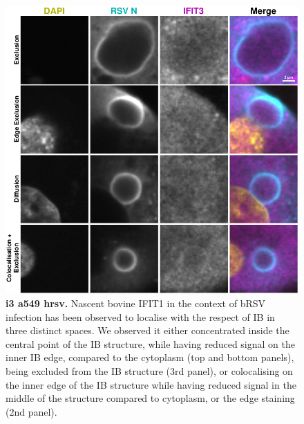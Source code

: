\begin{figure}
    \centering
    \includegraphics[width=1\linewidth]{09. Chapter 4/Figs/02. Infection/02. IFIT3/03. a549 i3.pdf}
    \caption[i3 a549 hrsv]{\textbf{i3 a549 hrsv.} Nascent bovine IFIT1 in the context of bRSV infection has been observed to localise with the respect of IB in three distinct spaces. We observed it either concentrated inside the central point of the IB structure, while having reduced signal on the inner IB edge, compared to the cytoplasm (top and bottom panels), being excluded from the IB structure (3rd panel), or colocalising on the inner edge of the IB structure while having reduced signal in the middle of the structure compared to cytoplasm, or the edge staining (2nd panel).}
    \label{fig:i3 a549 hrsv infection}
\end{figure}

